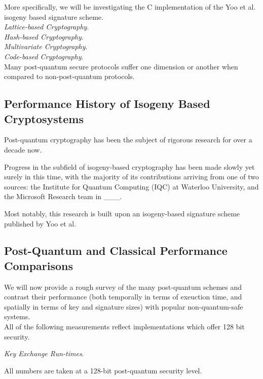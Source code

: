 More specifically, we will be investigating the C implementation of the Yoo et al. isogeny based signature scheme.\\

\noindent
\textit{Lattice-based Cryptography}.\\

\noindent
\textit{Hash-based Cryptography}.\\

\noindent
\textit{Multivariate Cryptography}.\\

\noindent
\textit{Code-based Cryptography}.\\

Many post-quantum secure protocols suffer one dimension or another when compared to non-post-quantum protocols.


\subsection{Performance History of Isogeny Based Cryptosystems}

Post-quantum cryptography has been the subject of rigorous research for over a decade now. 

Progress in the subfield of isogeny-based cryptography has been made slowly yet surely in this time, with the majority of its contributions arriving from one of two sources: the Institute for Quantum Computing (IQC) at Waterloo University, and the Microsoft Research team in \_\_\_. 

Most notably, this research is built upon an isogeny-based signature scheme published by Yoo et al. 

\subsection{Post-Quantum and Classical Performance Comparisons}

We will now provide a rough survey of the many post-quantum schemes and contrast their performance (both temporally in terms of exeuction time, and spatially in terms of key and signature sizes) with popular non-quantum-safe systems.\\

All of the following measurements reflect implementations which offer 128 bit security.

\noindent
\textit{Key Exchange Run-times}.

All numbers are taken at a 128-bit post-quantum security level.

